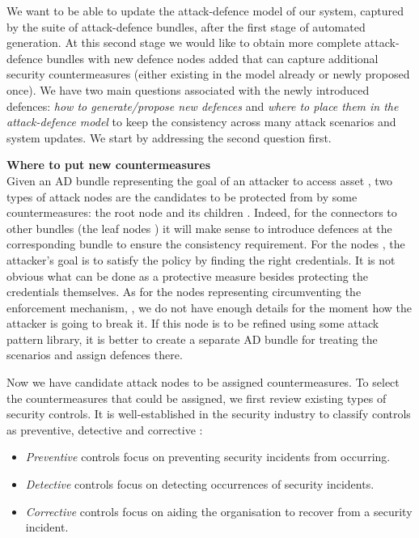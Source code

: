 \documentclass{llncs}
\begin{document}
We want to be able to update the attack-defence model of our system, captured by the suite of attack-defence bundles, after the first stage of automated generation. At this second stage we would like to obtain more complete attack-defence bundles with new defence nodes added that can capture additional security countermeasures (either existing in the model already or newly proposed once). We have two main questions associated with the newly introduced defences: \emph{how to generate/propose new defences} and \emph{where to place them in the attack-defence model} to keep the consistency across many attack scenarios and system updates. We start by addressing the second question first.


\textbf{Where to put new countermeasures}\\
Given an AD bundle representing the goal of an attacker to access asset , two types of attack nodes are the candidates to be protected from by some countermeasures: the root node \taccess and its children \taccfrom. Indeed, for the connectors to other bundles (the leaf nodes \taccess) it will make sense to introduce defences at the corresponding bundle to ensure the consistency requirement. For the nodes \tsatpol, the attacker's goal is to satisfy the policy by finding the right credentials. It is not obvious what can be done as a protective measure besides protecting the credentials themselves. As for the nodes representing circumventing the enforcement mechanism, \tbreak, we do not have enough details for the moment how the attacker is going to break it. If this node is to be refined using some attack pattern library, it is better to create a separate AD bundle for treating the scenarios and assign defences there.

Now we have candidate attack nodes to be assigned countermeasures. To select the countermeasures that could be assigned, we first review existing types of security controls. It is well-established in the security industry to classify controls as preventive, detective and corrective \cite{NIST-800-30}:
\begin{itemize}
\item \emph{Preventive}	controls focus on preventing security incidents from occurring. 
\item \emph{Detective} controls focus on detecting occurrences of security incidents.
\item \emph{Corrective} controls focus on aiding the organisation to recover from a security incident. 
\end{itemize}
\end{document}
